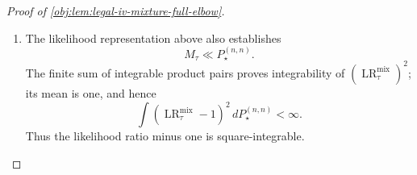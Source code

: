 \documentclass[11pt]{article}
\begin{document}
\begin{proof}[Proof of \cref{obj:lem:legal-iv-mixture-full-elbow}]
\begin{enumerate}
For each fixed \(\lambda\), the products \(\lambda_{\ell}\lambda'_{\ell}\) are independent uniform signs. Factoring their exponential moment and using the standard inequality
\[
\cosh(t)\le e^{t^2/2},\qquad t\in\mathbb R,
\]
gives
\[
\begin{aligned}
\mathbb E_{\lambda'}
\exp\left\{
\frac{nh^2\{\gamma(b,\tau)+1\}}
{2K_{\mathrm L}}\mathscr O(\lambda,\lambda')
\right\}
&=
\cosh\left(
\frac{nh^2\{\gamma(b,\tau)+1\}}{2K_{\mathrm L}}
\right)^{K_{\mathrm L}}\\
&\le
\exp\left\{
\frac{n^2h^4\{\gamma(b,\tau)+1\}^2}
{8K_{\mathrm L}}
\right\}.
\end{aligned}
\]
Averaging over \(\lambda\) preserves this bound. Finally,
\[
n^2\le K_{\mathrm L}^{3/2},
\qquad
h^4=c_{\star}^4K_{\mathrm L}^{-1/2},
\]
so
\[
\frac{n^2h^4\{\gamma(b,\tau)+1\}^2}{8K_{\mathrm L}}
=
\frac{n^2}{K_{\mathrm L}^{3/2}}
\frac{\{\gamma(b,\tau)+1\}^2}{8}c_{\star}^4
\le
\frac{(139/15)^2}{8}c_{\star}^4
=
\frac{19321}{1800}c_{\star}^4.
\]
This proves
\[
1+\chi^2(M_{\tau},P_{\star}^{(n,n)})
\le\exp\{C_{\mathrm{mix}}c_{\star}^4\}.
\]

With the distance normalization in \cref{obj:synth_17}, absolute continuity and Cauchy--Schwarz yield
\[
\begin{aligned}
\operatorname{TV}(M_{\tau},P_{\star}^{(n,n)})
&=
\frac12\int
\left|\operatorname{LR}_{\tau}^{\mathrm{mix}}-1\right|
\,dP_{\star}^{(n,n)}\\
&\le
\frac12\left\{
\int
\left(\operatorname{LR}_{\tau}^{\mathrm{mix}}-1\right)^2
\,dP_{\star}^{(n,n)}
\right\}^{1/2}\\
&=\frac12\sqrt{\chi^2(M_{\tau},P_{\star}^{(n,n)})}.
\end{aligned}
\]
The amplitude calibration therefore gives
\[
\chi^2(M_{\tau},P_{\star}^{(n,n)})
\le\exp\{C_{\mathrm{mix}}c_{\star}^4\}-1
\le(1-\alpha)^2,
\]
and, because \(1-\alpha>0\),
\[
\operatorname{TV}(M_{\tau},P_{\star}^{(n,n)})
\le\frac{1-\alpha}{2}.
\]
Every estimate is uniform over \(\tau\in[-1,1]\).

\item
The likelihood representation above also establishes
\[
M_{\tau}\ll P_{\star}^{(n,n)}.
\]
The finite sum of integrable product pairs proves integrability of
\((\operatorname{LR}_{\tau}^{\mathrm{mix}})^2\); its mean is one, and hence
\[
\int
\left(\operatorname{LR}_{\tau}^{\mathrm{mix}}-1\right)^2
\,dP_{\star}^{(n,n)}
<\infty.
\]
Thus the likelihood ratio minus one is square-integrable.


\end{enumerate}
\end{proof}
\end{document}
